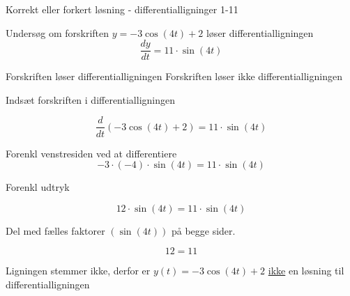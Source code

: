 \documentclass{article}
\begin{document}
\begin{exercise}{Korrekt eller forkert løsning - differentialligninger 1-11}
	
	
	Undersøg om forskriften $y =  -3 \cos(4t) + 2$ løser differentialligningen
	\[
	\frac{dy}{dt} = 11 \cdot \sin(4t)
	\]
	
\begin{multichoice}
	\itemfalse Forskriften løser differentialligningen 
	\itemtrue Forskriften løser ikke differentialligningen 
\end{multichoice}
	
	\hint
	
	Indsæt forskriften i differentialligningen
	
	\hint
	\[
	\frac{d}{dt} \left(-3 \cos(4t) + 2\right) = 11 \cdot \sin(4t)
	\]
	
	
	\hint
	
	Forenkl venstresiden ved at differentiere
	\[
	-3 \cdot (-4) \cdot \sin(4t) = 11 \cdot \sin(4t)
	\]
	
	\hint
	
	Forenkl udtryk
	
	\hint
	\[
	12 \cdot \sin(4t) = 11 \cdot \sin(4t)
	\]
	
	\hint
	Del med fælles faktorer $\left(\sin(4t) \right)$ på begge sider.
	
	\hint
	
	\[
	12 = 11
	\]
	
	
	\hint
	
	Ligningen stemmer ikke, derfor er $y(t) = -3 \cos(4t) + 2$ \underline{ikke} en løsning til differentialligningen
	
\end{exercise}

\newpage
\end{document}
